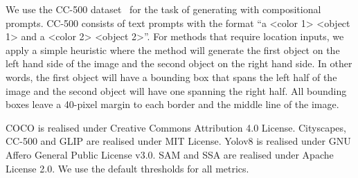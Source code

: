 We use the CC-500 dataset~\citep{structurediffusion} for the task of generating with compositional prompts. CC-500 consists of text prompts with the format ``a <color 1> <object 1> and a <color 2> <object 2>''. For methods that require location inputs, we apply a simple heuristic where the method will generate the first object on the left hand side of the image and the second object on the right hand side.
In other words, the first object will have a bounding box that spans the left half of the image and the second object will have one spanning the right half. All bounding boxes leave a 40-pixel margin to each border and the middle line of the image.

COCO is realised under Creative Commons Attribution 4.0 License. Cityscapes, CC-500 and GLIP are realised under MIT License. Yolov8 is realised under GNU Affero General Public License v3.0. SAM and SSA are realised under Apache License 2.0.  We use the default thresholds for all metrics.